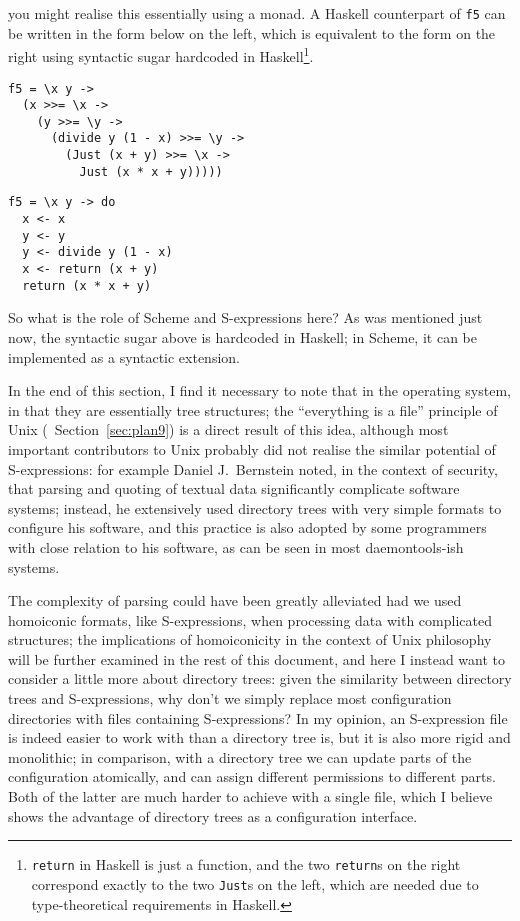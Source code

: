 you might realise this essentially using a monad.  A Haskell counterpart of
\verb|f5| can be written in the form below on the left, which is equivalent
to the form on the right using syntactic sugar hardcoded in Haskell\footnote%
{\texttt{return} in Haskell is just a function, and the two \texttt{return}s
on the right correspond exactly to the two \texttt{Just}s on the left,
which are needed due to type-theoretical requirements in Haskell.}.
\colskipa\begin{multicols}{2}
\begin{quoting}
\begin{Verbatim}
f5 = \x y ->
  (x >>= \x ->
    (y >>= \y ->
      (divide y (1 - x) >>= \y ->
        (Just (x + y) >>= \x ->
          Just (x * x + y)))))
\end{Verbatim}
\end{quoting}
\begin{quoting}
\begin{Verbatim}
f5 = \x y -> do
  x <- x
  y <- y
  y <- divide y (1 - x)
  x <- return (x + y)
  return (x * x + y)
\end{Verbatim}
\end{quoting}
\end{multicols}\colskipb\noindent%
So what is the role of Scheme and S-expressions here?  As was mentioned
just now, the syntactic sugar above is hardcoded in Haskell;
in Scheme, it can be implemented as a syntactic extension.

In the end of this section, I find it necessary to note that in the operating
system,  in that they are
essentially tree structures; the ``everything is a file'' principle of Unix
(\cf~Section~\ref{sec:plan9}) is a direct result of this idea, although
most important contributors to Unix probably did not realise the similar
potential of S-expressions: for example Daniel J.\ Bernstein noted, in the
context of security, that parsing and quoting of textual data significantly
complicate software systems; instead, he extensively
used directory trees with very simple formats to configure his software, and
this practice is also adopted by some programmers with close relation
to his software, as can be seen in most daemontools-ish systems.

The complexity of parsing could have been greatly alleviated had we used
homoiconic formats, like S-expressions, when processing data with complicated
structures; the implications of homoiconicity in the context of Unix philosophy
will be further examined in the rest of this document, and here I instead
want to consider a little more about directory trees: given the similarity
between directory trees and S-expressions, why don't we simply replace most
configuration directories with files containing S-expressions?  In my opinion,
an S-expression file is indeed easier to work with than a directory tree is,
but it is also more rigid and monolithic; in comparison, with a directory
tree we can update parts of the configuration atomically, and can assign
different permissions to different parts.  Both of the latter are much
harder to achieve with a single file, which I believe shows the
advantage of directory trees as a configuration interface.

